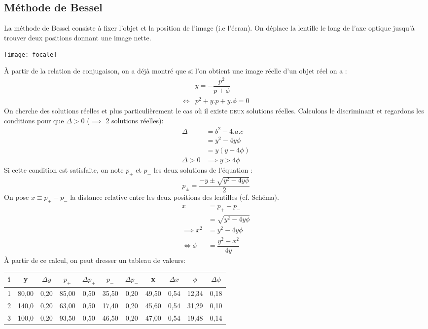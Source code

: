 \documentclass[12pt,a4paper]{article}
\begin{document}
	\subsection{Méthode de Bessel}
	La méthode de Bessel consiste à fixer l'objet et la position de l'image (i.e l'écran). On déplace la lentille le long de l'axe optique jusqu'à trouver deux positions donnant une image nette.
	\begin{center}
		\texttt{[image: focale]}
	\end{center}
	À partir de la relation de conjugaison, on a déjà montré que si l'on obtient une image réelle d'un objet réel on a : 
	\begin{align*}
	&y=-\dfrac{p^2}{p+\phi}\\
	\iff &p^2 + y.p + y.\phi=0
	\end{align*}
	On cherche des solutions réelles et plus particulièrement le cas où il existe \textsc{deux} solutions réelles. Calculons le discriminant et regardons les conditions pour que $\Delta>0$ ($\implies$ 2 solutions réelles): 
	\begin{align*}
	\Delta &= b^2-4.a.c \\
	&= y^2-4y\phi\\
	&=y(y-4\phi)\\[1em]
	\Delta>0&\implies y>4\phi
	\end{align*}
	Si cette condition est satisfaite, on note $p_+$ et $p_-$ les deux solutions de l'équation :
	$$p_{\pm}=\dfrac{-y\pm\sqrt{y^2-4y\phi}}{2}$$
	On pose $x\equiv p_+ - p_-$ la distance relative entre les deux positions des lentilles (cf. Schéma).
	\begin{align*}
	x&=p_+ - p_-\\
	&=\sqrt{y^2-4y\phi}\\
	\implies x^2 &= y^2-4y\phi\\[1em]
	\iff \phi &= \dfrac{y^2-x^2}{4y}
	\end{align*}
	À partir de ce calcul, on peut dresser un tableau de valeurs:
	\begin{center}
		\begin{tabular}{|c|c|c|c|c|c|c|c|c|c|c|}
			\hline
			i & y & $\Delta y$ & $p_+$ & $\Delta p_+$ & $p_-$ & $\Delta p_-$ & x & $\Delta x$ & $\phi$ & $\Delta\phi$\\
			\hline
			1 & 80,00 & 0,20 & 85,00 & 0,50 & 35,50 & 0,20 & 49,50 & 0,54 & 12,34 & 0,18\\
			\hline
			2 & 140,0 & 0,20 & 63,00 & 0,50 & 17,40 & 0,20 & 45,60 & 0,54 & 31,29 & 0,10\\
			\hline
			3 & 100,0 & 0,20 & 93,50 & 0,50 & 46,50 & 0,20 & 47,00 & 0,54 & 19,48 & 0,14\\
			\hline
		\end{tabular}
	\end{center}
	
\end{document}
